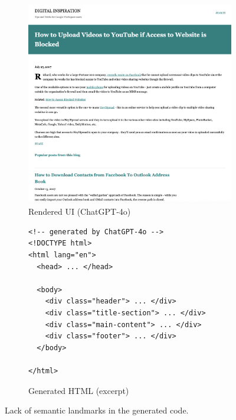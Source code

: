 

  



\newpage




\lstset{
  language=HTML,
  basicstyle=\ttfamily\small,
  numbers=left,
  frame=single
}

\begin{figure}[t]
  \centering
  \begin{subfigure}[t]{.46\linewidth}
    \includegraphics[width=\linewidth]{figures/landmarkwebpageexample.png}
    \caption{Rendered UI (ChatGPT‑4o)}
  \end{subfigure}\hfill
  \begin{subfigure}[t]{.50\linewidth}
    \begin{minipage}{\linewidth}
\begin{lstlisting}
<!-- generated by ChatGPT-4o -->
<!DOCTYPE html>
<html lang="en">
  <head> ... </head>

  <body>
    <div class="header"> ... </div>
    <div class="title-section"> ... </div>
    <div class="main-content"> ... </div>
    <div class="footer"> ... </div>
  </body>
  
</html>
\end{lstlisting}
    \end{minipage}
    \caption{Generated HTML (excerpt)}
  \end{subfigure}
  \caption{Lack of semantic landmarks in the generated code.}
  \label{fig:landmark-missing}
\end{figure}








